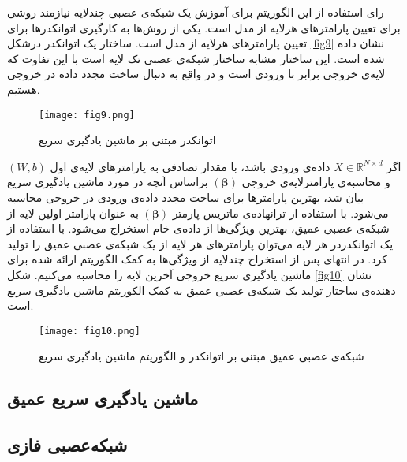 رای استفاده از این الگوریتم برای آموزش یک شبکه‌ی عصبی چندلایه نیازمند روشی برای تعیین پارامترهای هرلایه از مدل است. یکی از روش‌ها به کارگیری اتوانکدرها برای تعیین پارامترهای هرلایه از مدل است. ساختار یک اتوانکدر درشکل 
\eqref{fig9}
نشان داده شده است. این ساختار مشابه ساختار شبکه‌ی عصبی تک لایه است با این تفاوت که لایه‌ی خروجی برابر با ورودی است و در واقع به دنبال ساخت مجدد داده در خروجی هستیم. 
\begin{figure}[h]
	\begin{center}
		\texttt{[image: fig9.png]}
		\caption{اتوانکدر مبتنی بر ماشین یادگیری سریع }
		\label{fig9}
	\end{center}
\end{figure}
اگر 
$X\in \mathbb{R}^{N\times d}$
داده‌ی ورودی باشد، با مقدار تصادفی به پارامترهای لایه‌ی اول 
$(W,b)$
و محاسبه‌ی پارامترلایه‌ی خروجی 
$(\boldsymbol{\beta})$
براساس آنچه در مورد ماشین یادگیری سریع بیان شد، بهترین پارامترها برای ساخت مجدد داده‌ی ورودی در خروجی محاسبه می‌شود. با استفاده از ترانهاده‌ی ماتریس پارمتر
$(\boldsymbol{\beta})$
به عنوان پارامتر اولین لایه از شبکه‌ی عصبی عمیق، بهترین ویژگی‌ها از داده‌ی خام استخراج می‌شود. با استفاده از یک اتوانکدردر هر لایه  می‌توان پارامترهای هر لایه از یک شبکه‌ی عصبی عمیق را تولید کرد. در انتهای پس از استخراج چندلایه از ویژگی‌ها به کمک الگوریتم ارائه شده برای ماشین یادگیری سریع خروجی آخرین لایه را محاسبه می‌کنیم. شکل 
\eqref{fig10}
نشان دهنده‌ی ساختار تولید یک شبکه‌ی عصبی عمیق به کمک الکوریتم ماشین یادگیری سریع است. 
\begin{figure}[h]
	\begin{center}
		\texttt{[image: fig10.png]}
		\caption{شبکه‌ی عصبی عمیق مبتنی بر اتوانکدر و الگوریتم ماشین یادگیری سریع }
		\label{fig10}
	\end{center}
\end{figure}
\subsection{ماشین یادگیری سریع عمیق }
\subsection{شبکه‌عصبی فازی}


